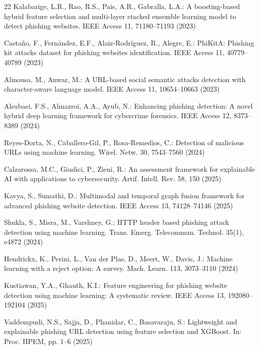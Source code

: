 \documentclass{llncs}
\begin{document}
\begin{thebibliography}{22}
Kalabarige, L.R., Rao, R.S., Pais, A.R., Gabralla, L.A.: A boosting-based hybrid feature selection and multi-layer stacked ensemble learning model to detect phishing websites. IEEE Access 11, 71180--71193 (2023)

Casta{\~n}o, F., Fern{\'a}ndez, E.F., Alaiz-Rodr{\'i}guez, R., Alegre, E.: PhiKitA: Phishing kit attacks dataset for phishing websites identification. IEEE Access 11, 40779--40789 (2023)

Almousa, M., Anwar, M.: A URL-based social semantic attacks detection with character-aware language model. IEEE Access 11, 10654--10663 (2023)

Alsubaei, F.S., Almazroi, A.A., Ayub, N.: Enhancing phishing detection: A novel hybrid deep learning framework for cybercrime forensics. IEEE Access 12, 8373--8389 (2024)

Reyes-Dorta, N., Caballero-Gil, P., Rosa-Remedios, C.: Detection of malicious URLs using machine learning. Wirel. Netw. 30, 7543--7560 (2024)

Calzarossa, M.C., Giudici, P., Zieni, R.: An assessment framework for explainable AI with applications to cybersecurity. Artif. Intell. Rev. 58, 150 (2025)

Kavya, S., Sumathi, D.: Multimodal and temporal graph fusion framework for advanced phishing website detection. IEEE Access 13, 74128--74146 (2025)

Shukla, S., Misra, M., Varshney, G.: HTTP header based phishing attack detection using machine learning. Trans. Emerg. Telecommun. Technol. 35(1), e4872 (2024)

Hendrickx, K., Perini, L., Van der Plas, D., Meert, W., Davis, J.: Machine learning with a reject option: A survey. Mach. Learn. 113, 3073--3110 (2024)

Kustiawan, Y.A., Ghauth, K.I.: Feature engineering for phishing website detection using machine learning: A systematic review. IEEE Access 13, 192080--192104 (2025)

Vaddempudi, N.S., Sajja, D., Phanidar, C., Basavaraju, S.: Lightweight and explainable phishing URL detection using feature selection and XGBoost. In: Proc. IIPEM, pp. 1--6 (2025)

\end{thebibliography}
\end{document}
